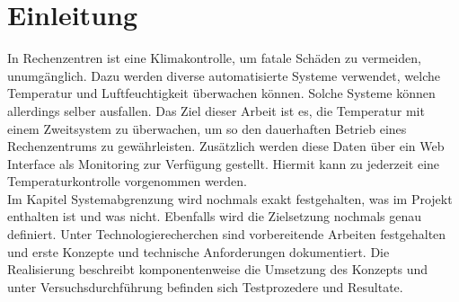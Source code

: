 \section{Einleitung}
In Rechenzentren ist eine Klimakontrolle, um fatale Schäden zu vermeiden, unumgänglich. Dazu werden diverse automatisierte Systeme verwendet, welche Temperatur und Luftfeuchtigkeit überwachen können. Solche Systeme können allerdings selber ausfallen. Das Ziel dieser Arbeit ist es, die Temperatur mit einem Zweitsystem zu überwachen, um so den dauerhaften Betrieb eines Rechenzentrums zu gewährleisten. Zusätzlich werden diese Daten über ein Web Interface als Monitoring zur Verfügung gestellt. Hiermit kann zu jederzeit eine Temperaturkontrolle vorgenommen werden.\\
Im Kapitel Systemabgrenzung wird nochmals exakt festgehalten, was im Projekt enthalten ist und was nicht. Ebenfalls wird die Zielsetzung nochmals genau definiert. Unter Technologierecherchen sind vorbereitende Arbeiten festgehalten und erste Konzepte und technische Anforderungen dokumentiert. Die Realisierung beschreibt komponentenweise die Umsetzung des Konzepts und unter Versuchsdurchführung befinden sich Testprozedere und Resultate.
\newpage